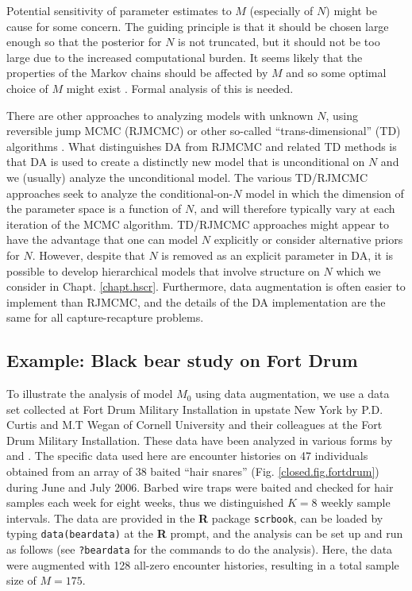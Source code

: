 Potential sensitivity of parameter estimates to $M$ (especially of $N$) might
be cause for some concern.
The guiding principle is
that it should be chosen large enough so that the posterior for $N$ is
not truncated, but it should not be too large due to the increased
computational burden. It seems likely that the properties of the
Markov chains should be affected by $M$ and so some optimal choice of
$M$ might exist \citep{gopalaswamy:2012}.
Formal analysis of this is needed.

There are other approaches to analyzing models with unknown $N$, using
reversible jump MCMC (RJMCMC) or other so-called ``trans-dimensional''
(TD) algorithms \citep{king_brooks:2001, durban_elston:2005,
  king_etal:2008, schofield_barker:2008, wright_etal:2009}.  What
distinguishes DA from RJMCMC and related TD methods is that DA is used
to create a distinctly new model that is unconditional on $N$ and we
(usually) analyze the unconditional model. The various TD/RJMCMC
approaches seek to analyze the conditional-on-$N$ model in which the
dimension of the parameter space is a function of $N$, and will
therefore typically vary at each iteration of the MCMC
algorithm. TD/RJMCMC approaches might appear to have the advantage
that one can model $N$ explicitly or consider alternative priors for
$N$. However, despite that $N$ is removed as an explicit parameter in
DA, it is possible to develop hierarchical models that involve
structure on $N$ \citep{converse_royle:2012, royle_etal:2012arXiv, royle_converse:2013} which
we consider in Chapt. \ref{chapt.hscr}. Furthermore, data augmentation
is often easier to implement than RJMCMC, and the details of the
DA implementation are the same for all capture-recapture problems.


\subsection{Example: Black bear study on Fort Drum}

To illustrate the analysis of model $M_0$ using data augmentation, we use
a data set collected at Fort Drum Military Installation in upstate New
York by P.D. Curtis and M.T Wegan of Cornell University and
their colleagues at the Fort Drum Military Installation.
These data have been analyzed in various forms by
\citet{wegan:2008,gardner_etal:2009} and \citet{gardner_etal:2010jwm}.
The specific data used here are encounter histories on 47 individuals
obtained from an array of 38 baited ``hair snares''
(Fig. \ref{closed.fig.fortdrum}) during June and July 2006.  Barbed wire
traps were baited and checked for hair samples each week for eight
weeks, thus we distinguished $K=8$ weekly sample intervals. The data are provided
in the {\bf R} package \mbox{\tt scrbook}, can be loaded by typing
\mbox{\tt data(beardata)} at the {\bf R} prompt,
and the analysis can be set up and run as
follows (see \mbox{\tt ?beardata} for the commands to do the
analysis).
Here, the data were augmented with 128
all-zero encounter histories, resulting in a total sample size of $M=175$.

